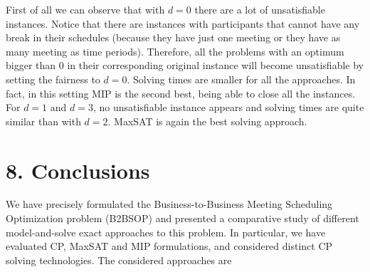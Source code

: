 \documentclass[10pt]{article}
\begin{document}
First of all we can observe that with $d=0$ there are a lot of unsatisfiable instances. Notice that there are instances with participants that cannot have any break in their schedules (because they have just one meeting or they have as many meeting as time periods). Therefore, all the problems with an optimum bigger than 0 in their corresponding original instance will become unsatisfiable by setting the fairness to $d=0$. Solving times are smaller for all the approaches. In fact, in this setting MIP is the second best, being able to close all the instances. For $d=1$ and $d=3$, no unsatisfiable instance appears and solving times are quite similar than with $d=2$. MaxSAT is again the best solving approach.

\section*{8. Conclusions}
We have precisely formulated the Business-to-Business Meeting Scheduling Optimization problem (B2BSOP) and presented a comparative study of different model-and-solve exact approaches to this problem. In particular, we have evaluated CP, MaxSAT and MIP formulations, and considered distinct CP solving technologies. The considered approaches are
\end{document}
